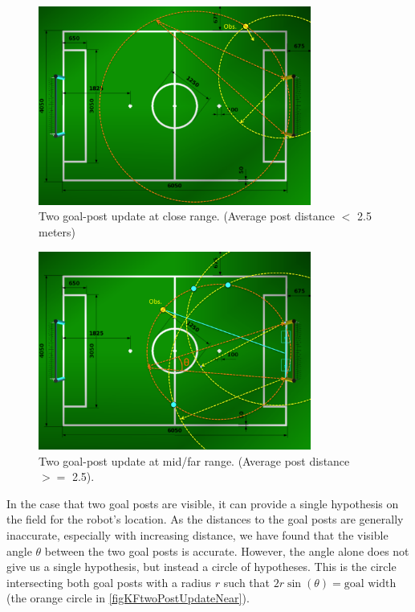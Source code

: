 \documentclass[pdftex,11pt,a4paper]{report}
\begin{document}
\begin{figure} [ht]
\centering
\includegraphics[width=0.8\textwidth]{figures/KFtwoPostUpdateNear}
\caption{Two goal-post update at close range. (Average post distance $<$ 2.5
meters)}
\label{figKFtwoPostUpdateNear}
\end{figure}

\begin{figure} [ht]
\centering
\includegraphics[width=0.8\textwidth]{figures/KFtwoPostUpdateFar}
\caption{Two goal-post update at mid/far range. (Average post distance $>=$
2.5).}
\label{figKFtwoPostUpdateFar}
\end{figure}

In the case that two goal posts are visible, it can provide a single hypothesis
on the field for the robot's location.  As the distances to the goal posts are
generally inaccurate, especially with increasing distance, we have found that
the visible angle $\theta$ between the two goal posts is accurate.  However, the
angle alone does not give us a single hypothesis, but instead a circle of
hypotheses. This is the circle intersecting both goal posts with a radius $r$
such that $2r \sin(\theta) = \textrm{goal width} $ (the orange circle in
\autoref{figKFtwoPostUpdateNear}).
\end{document}

